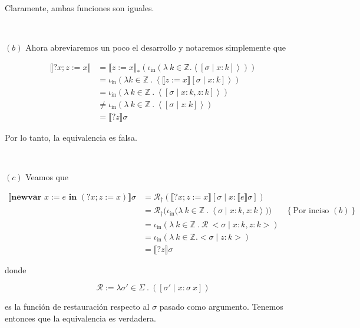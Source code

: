 \documentclass[article, 12pt]{article}
\begin{document}
Claramente, ambas funciones son iguales.

~ 


$(b)$ Ahora abreviaremos un poco el desarrollo y notaremos simplemente que

\begin{align*}
  \llbracket ?x; z := x \rrbracket 
  &= \llbracket z := x \rrbracket_*\left( \iota_{\text{in}} \left( \lambda ~ k
  \in \mathbb{Z} . \left< [\sigma \mid x : k] \right> \right)  \right) \\ 
  &=\iota_{\text{in}} \left( \lambda k \in \mathbb{Z} ~.~ \left< \llbracket z :=
  x\rrbracket[\sigma \mid x : k] \right> \right)  \\ 
  &=\iota_{\text{in}} \left( \lambda ~k \in \mathbb{Z} ~.~ \left< [\sigma \mid x
  :k, z : k] \right> \right)  \\
  &\neq \iota_{\text{in}} \left( \lambda ~ k \in \mathbb{Z} ~.~ \left<[\sigma
  \mid z : k] \right> \right)  \\ 
  &= \llbracket ?z \rrbracket\sigma
\end{align*}


Por lo tanto, la equivalencia es falsa.

~

$(c)$ Veamos que 

\begin{align*}
  \llbracket \textbf{newvar } x := e \textbf{ in } (?x;z :=x)\rrbracket\sigma 
  &= \mathcal{R}_\dagger \left( \llbracket ?x; z:=x \rrbracket [\sigma \mid x :
  \llbracket e \rrbracket\sigma] \right)  \\ 
  &=\mathcal{R}_\dagger \Bigg( \iota_{\text{in}}\Big( \lambda ~ k \in \mathbb{Z}
~.~ \left< \sigma \mid x : k, z : k \right>\Big) \Bigg) &\left\{ \text{Por
inciso } (b) \right\} \\ 
&=\iota_{\text{in}} \left( \lambda ~ k \in \mathbb{Z} ~.~ \mathcal{R}~\Big<
\sigma \mid x :k, z : k \Big> \right)  \\ 
&=\iota_{\text{in}} \left( \lambda ~ k \in \mathbb{Z} . \big< \sigma \mid z :
k\big> \right)  \\ 
&=\llbracket ?z \rrbracket\sigma
\end{align*}

donde 

\begin{equation*}
  \mathcal{R} := \lambda \sigma' \in \Sigma ~.~ \left( [\sigma' \mid x : \sigma
  ~ x] \right) 
\end{equation*}

es la función de restauración respecto al $\sigma$ pasado como argumento.
Tenemos entonces que la equivalencia es verdadera.
\end{document}
